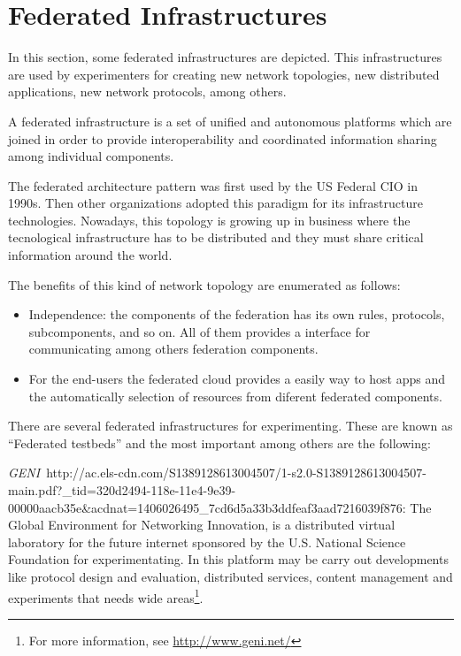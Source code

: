 \section{Federated Infrastructures}

In this section, some federated infrastructures are depicted. This
infrastructures are used by experimenters for creating new network topologies,
new distributed applications, new network protocols, among others.

A federated infrastructure is a set of unified and autonomous platforms which
are joined in order to provide interoperability and coordinated
information sharing among individual components. 

The federated architecture pattern was first used by the US Federal CIO in
1990s. Then other organizations adopted this paradigm for its infrastructure
technologies. Nowadays, this topology is growing up in business where the
tecnological infrastructure has to be distributed and they must share critical
information around the world.

The benefits of this kind of network topology are enumerated as follows:
\begin{itemize}
\item Independence: the components of the federation has its own rules,
  protocols, subcomponents, and so on. All of them provides a interface for
  communicating among others federation components.
\item For the end-users the federated cloud provides a easily way to host apps
  and the automatically selection of resources from diferent federated components.
\end{itemize}

There are several federated infrastructures for experimenting. These are known
as ``Federated testbeds'' and the most important among others are the following:

\emph{GENI}~{http://ac.els-cdn.com/S1389128613004507/1-s2.0-S1389128613004507-main.pdf?\_tid=320d2494-118e-11e4-9e39-00000aacb35e\&acdnat=1406026495\_7cd6d5a33b3ddfeaf3aad7216039f876}:
The Global Environment for Networking Innovation, is a distributed virtual
laboratory for the future internet sponsored by the U.S. National Science Foundation for
experimentating. In this platform may be carry out developments like protocol
design and evaluation, distributed services, content management and experiments
that needs wide areas\footnote{For more information, see
  \url{http://www.geni.net/}}.

